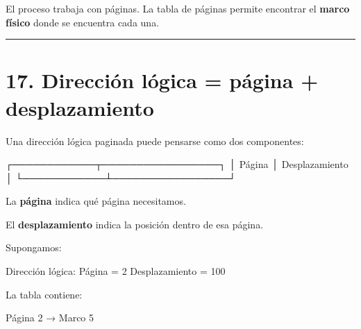 \documentclass[
  spanish,
  letterpaper,
]{scrbook}
\newenvironment{Shaded}{\begin{snugshade}}{\end{snugshade}}
\newcommand{\NormalTok}[1]{\textcolor[rgb]{0.00,0.23,0.31}{#1}}
\begin{document}
\begin{tcolorbox}[enhanced jigsaw, arc=.35mm, bottomrule=.15mm, bottomtitle=1mm, breakable, colback=white, colbacktitle=quarto-callout-note-color!10!white, colframe=quarto-callout-note-color-frame, coltitle=black, left=2mm, leftrule=.75mm, opacityback=0, opacitybacktitle=0.6, rightrule=.15mm, title=\textcolor{quarto-callout-note-color}{\faInfo}\hspace{0.5em}{La tabla funciona como un mapa}, titlerule=0mm, toprule=.15mm, toptitle=1mm]

El proceso trabaja con páginas. La tabla de páginas permite encontrar el
\textbf{marco físico} donde se encuentra cada una.

\end{tcolorbox}

\begin{center}\rule{0.5\linewidth}{0.5pt}\end{center}


\chapter{17. Dirección lógica = página +
desplazamiento}\label{direcciuxf3n-luxf3gica-puxe1gina-desplazamiento}

Una dirección lógica paginada puede pensarse como dos componentes:

\begin{Shaded}
\begin{Highlighting}[]
\NormalTok{┌────────────┬─────────────────┐}
\NormalTok{│   Página   │ Desplazamiento  │}
\NormalTok{└────────────┴─────────────────┘}
\end{Highlighting}
\end{Shaded}

La \textbf{página} indica qué página necesitamos.

El \textbf{desplazamiento} indica la posición dentro de esa página.

Supongamos:

\begin{Shaded}
\begin{Highlighting}[]
\NormalTok{Dirección lógica:}
\NormalTok{Página = 2}
\NormalTok{Desplazamiento = 100}
\end{Highlighting}
\end{Shaded}

La tabla contiene:

\begin{Shaded}
\begin{Highlighting}[]
\NormalTok{Página 2 → Marco 5}
\end{Highlighting}
\end{Shaded}
\end{document}
